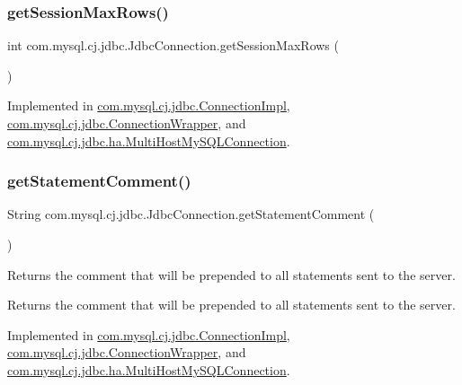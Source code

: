 \subsubsection{\texorpdfstring{get\+Session\+Max\+Rows()}{getSessionMaxRows()}}
{\footnotesize\ttfamily int com.\+mysql.\+cj.\+jdbc.\+Jdbc\+Connection.\+get\+Session\+Max\+Rows (\begin{DoxyParamCaption}{ }\end{DoxyParamCaption})}



Implemented in \mbox{\hyperlink{classcom_1_1mysql_1_1cj_1_1jdbc_1_1_connection_impl_ab5ca44f0832ea325d7b9d6acb8e2209c}{com.\+mysql.\+cj.\+jdbc.\+Connection\+Impl}}, \mbox{\hyperlink{classcom_1_1mysql_1_1cj_1_1jdbc_1_1_connection_wrapper_a8076db7ba3efe355700763205e2d92e3}{com.\+mysql.\+cj.\+jdbc.\+Connection\+Wrapper}}, and \mbox{\hyperlink{classcom_1_1mysql_1_1cj_1_1jdbc_1_1ha_1_1_multi_host_my_s_q_l_connection_ac24f7a7ab24a7ad05a057ad78d03ce4d}{com.\+mysql.\+cj.\+jdbc.\+ha.\+Multi\+Host\+My\+S\+Q\+L\+Connection}}.

\mbox{\label{interfacecom_1_1mysql_1_1cj_1_1jdbc_1_1_jdbc_connection_a11233536b54479183feb8eda938f72e9}} 
\subsubsection{\texorpdfstring{get\+Statement\+Comment()}{getStatementComment()}}
{\footnotesize\ttfamily String com.\+mysql.\+cj.\+jdbc.\+Jdbc\+Connection.\+get\+Statement\+Comment (\begin{DoxyParamCaption}{ }\end{DoxyParamCaption})}

Returns the comment that will be prepended to all statements sent to the server.

\begin{DoxyReturn}{Returns}
the comment that will be prepended to all statements sent to the server. 
\end{DoxyReturn}


Implemented in \mbox{\hyperlink{classcom_1_1mysql_1_1cj_1_1jdbc_1_1_connection_impl_a4ac13f311c3ef1e5e6718b17f3b5e090}{com.\+mysql.\+cj.\+jdbc.\+Connection\+Impl}}, \mbox{\hyperlink{classcom_1_1mysql_1_1cj_1_1jdbc_1_1_connection_wrapper_a4fefdf8c3a3be123e8391959185cde40}{com.\+mysql.\+cj.\+jdbc.\+Connection\+Wrapper}}, and \mbox{\hyperlink{classcom_1_1mysql_1_1cj_1_1jdbc_1_1ha_1_1_multi_host_my_s_q_l_connection_ae92114d9d277c58982679012dccd1017}{com.\+mysql.\+cj.\+jdbc.\+ha.\+Multi\+Host\+My\+S\+Q\+L\+Connection}}.

